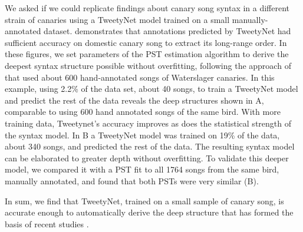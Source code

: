\documentclass[9pt,lineno]{elife}
\begin{document}
We asked if we could replicate findings about canary song syntax in a different strain of canaries using a TweetyNet model trained on a small manually-annotated dataset. 
 demonstrates that annotations predicted by TweetyNet had sufficient accuracy on domestic canary song to extract its long-range order. In these figures, we set parameters of the PST estimation algorithm to derive the deepest syntax structure possible without overfitting, following the approach of \cite{markowitz_long-range_2013} that used about 600 hand-annotated songs of Waterslager canaries. 
 In this example, using 2.2\% of the data set, about 40 songs, to train a TweetyNet model and predict the rest of the data reveals the deep structures shown in A, comparable to using 600 hand annotated songs of the same bird. With more training data, Tweetynet's accuracy improves as does the statistical strength of the syntax model. In B a TweetyNet model was trained on 19\% of the data, about 340 songs, and predicted the rest of the data. The resulting syntax model can be elaborated to greater depth without overfitting. To validate this deeper model, we compared it with a PST fit to all 1764 songs from the same bird, manually annotated, and found that both PSTs were very similar (B).

In sum, we find that TweetyNet, trained on a small sample of canary song, is accurate enough to automatically derive the deep structure that has formed the basis of recent studies \citep{markowitz_long-range_2013,cohen_hidden_2020}.
\end{document}

